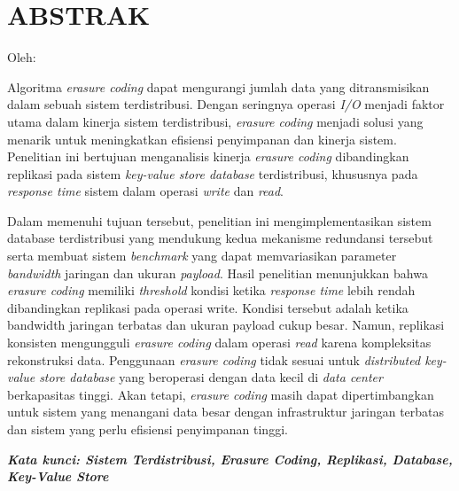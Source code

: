 \clearpage
\chapter*{ABSTRAK}

\begin{center}
  \center
  \begin{singlespace}
    \large\bfseries\MakeUppercase{\thetitle}
    
    \normalfont\normalsize
    Oleh:
    
    \bfseries \theauthor
  \end{singlespace}
\end{center}

\begin{singlespace}
  \small
  Algoritma \textit{erasure coding} dapat mengurangi jumlah data yang ditransmisikan dalam sebuah sistem terdistribusi. Dengan seringnya operasi \textit{I/O} menjadi faktor utama dalam kinerja sistem terdistribusi, \textit{erasure coding} menjadi solusi yang menarik untuk meningkatkan efisiensi penyimpanan dan kinerja sistem. Penelitian ini bertujuan menganalisis kinerja \textit{erasure coding} dibandingkan replikasi pada sistem \textit{key-value store database} terdistribusi, khususnya pada \textit{response time} sistem dalam operasi \textit{write} dan \textit{read}.
  
  Dalam memenuhi tujuan tersebut, penelitian ini mengimplementasikan sistem database terdistribusi yang mendukung kedua mekanisme redundansi tersebut serta membuat sistem \textit{benchmark} yang dapat memvariasikan parameter \textit{bandwidth} jaringan dan ukuran \textit{payload}. Hasil penelitian menunjukkan bahwa \textit{erasure coding} memiliki \textit{threshold} kondisi ketika \textit{response time} lebih rendah dibandingkan replikasi pada operasi write. Kondisi tersebut adalah ketika bandwidth jaringan terbatas dan ukuran payload cukup besar. Namun, replikasi konsisten mengungguli \textit{erasure coding} dalam operasi \textit{read} karena kompleksitas rekonstruksi data. Penggunaan \textit{erasure coding} tidak sesuai untuk \textit{distributed key-value store database} yang beroperasi dengan data kecil di \textit{data center} berkapasitas tinggi. Akan tetapi, \textit{erasure coding} masih dapat dipertimbangkan untuk sistem yang menangani data besar dengan infrastruktur jaringan terbatas dan sistem yang perlu efisiensi penyimpanan tinggi.
  
  \textbf{\textit{Kata kunci: Sistem Terdistribusi, Erasure Coding, Replikasi, Database, Key-Value Store }}
  
\end{singlespace}
\clearpage